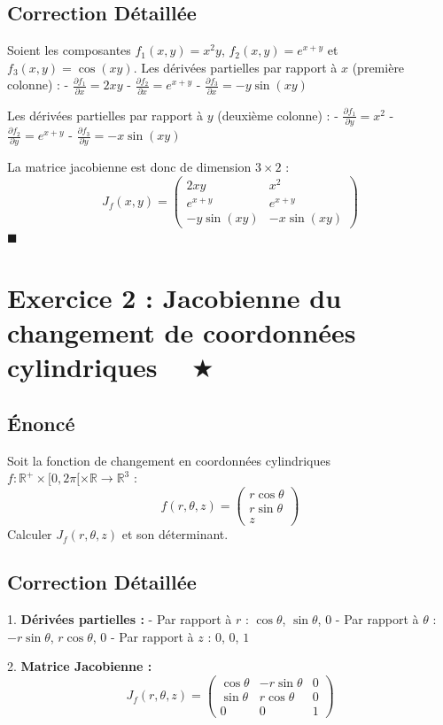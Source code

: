 \documentclass[11pt,a4paper]{article}
\begin{document}
\subsection*{Correction Détaillée}
Soient les composantes $f_1(x,y) = x^2 y$, $f_2(x,y) = e^{x+y}$ et $f_3(x,y) = \cos(xy)$.
Les dérivées partielles par rapport à $x$ (première colonne) :
- $\frac{\partial f_1}{\partial x} = 2xy$
- $\frac{\partial f_2}{\partial x} = e^{x+y}$
- $\frac{\partial f_3}{\partial x} = -y\sin(xy)$

Les dérivées partielles par rapport à $y$ (deuxième colonne) :
- $\frac{\partial f_1}{\partial y} = x^2$
- $\frac{\partial f_2}{\partial y} = e^{x+y}$
- $\frac{\partial f_3}{\partial y} = -x\sin(xy)$

La matrice jacobienne est donc de dimension $3 \times 2$ :
$$ J_f(x,y) = \begin{pmatrix} 2xy & x^2 \\ e^{x+y} & e^{x+y} \\ -y\sin(xy) & -x\sin(xy) \end{pmatrix} $$
$\blacksquare$

\newpage
\section*{Exercice 2 : Jacobienne du changement de coordonnées cylindriques $\quad \bigstar$}
\subsection*{Énoncé}
Soit la fonction de changement en coordonnées cylindriques $f : \mathbb{R}^+ \times [0, 2\pi[ \times \mathbb{R} \to \mathbb{R}^3$ :
$$ f(r, \theta, z) = \begin{pmatrix} r \cos \theta \\ r \sin \theta \\ z \end{pmatrix} $$
Calculer $J_f(r, \theta, z)$ et son déterminant.
\subsection*{Correction Détaillée}
1. \textbf{Dérivées partielles :}
   - Par rapport à $r$ : $\cos \theta$, $\sin \theta$, $0$
   - Par rapport à $\theta$ : $-r \sin \theta$, $r \cos \theta$, $0$
   - Par rapport à $z$ : $0$, $0$, $1$

2. \textbf{Matrice Jacobienne :}
   $$ J_f(r, \theta, z) = \begin{pmatrix} \cos \theta & -r \sin \theta & 0 \\ \sin \theta & r \cos \theta & 0 \\ 0 & 0 & 1 \end{pmatrix} $$
\end{document}
